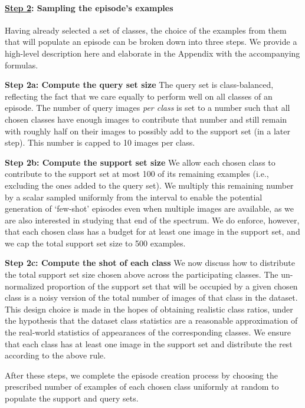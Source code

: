 \documentclass{article} \usepackage{iclr2020_conference,times}
\begin{document}
\paragraph{\underline{Step 2}: Sampling the episode's examples} Having already selected a set of classes, the choice of the examples from them that will
populate an episode can be broken down into three steps. We provide a high-level description here and elaborate in the Appendix with the accompanying formulas.

\textbf{Step 2a: Compute the query set size } The query set is class-balanced, reflecting
the fact that we care equally to perform well on all classes of an episode. The number
of query images \textit{per class} is set to a number such that all chosen classes
have enough images to contribute that number and still remain with roughly half on their
images to possibly add to the support set (in a later step). This number is capped to 10 images per class.

\textbf{Step 2b: Compute the support set size } We allow each chosen class to contribute to the
support set at most 100 of its remaining examples (i.e., excluding the ones added to the query set).
We multiply this remaining number by a scalar sampled uniformly from the interval  to
enable the potential generation of `few-shot' episodes even when multiple images are available,
as we are also interested in studying that end of the spectrum. We do enforce, however, that
each chosen class has a budget for at least one image in the support set, and we cap the total support set size to 500 examples.
\

\textbf{Step 2c: Compute the shot of each class } We now discuss how to distribute the total support set size chosen above across the participating classes. The un-normalized proportion of the support set that will be occupied by a given chosen class is a noisy version of the total number of images of that class in the dataset. This design choice is made in the hopes of obtaining realistic class ratios, under the hypothesis that the dataset class statistics are a reasonable approximation of the real-world statistics of appearances of the corresponding classes. We ensure that each class has at least one image in the support set and distribute the rest according to the above rule.

After these steps, we complete the episode creation process by choosing the
prescribed number of examples of each chosen class uniformly at random to
populate the support and query sets.
\end{document}
